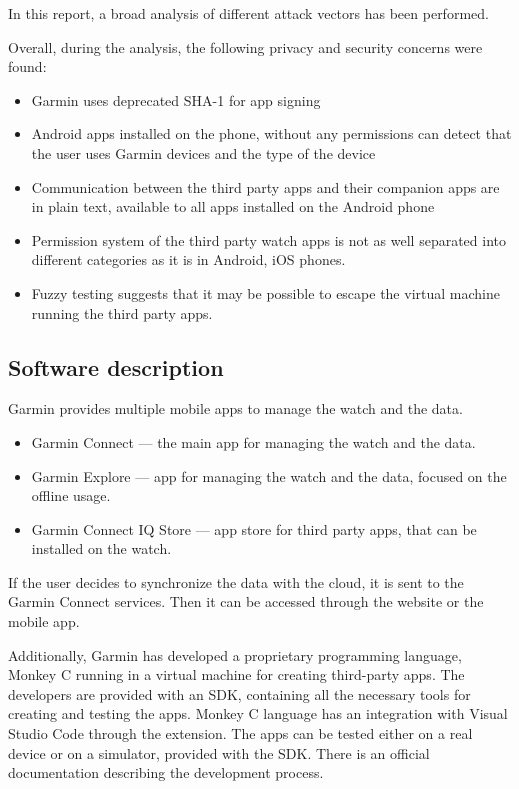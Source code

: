 In this report, a broad analysis of different attack vectors has been performed.

Overall, during the analysis, the following privacy and security concerns were found:
\begin{itemize}
    \item Garmin uses deprecated SHA-1 for app signing
    \item Android apps installed on the phone, without any permissions can detect that the user uses Garmin devices and the type of the device
    \item Communication between the third party apps and their companion apps are in plain text, available to all apps installed on the Android phone
    \item Permission system of the third party watch apps is not as well separated into different categories as it is in Android, iOS phones.
    \item Fuzzy testing suggests that it may be possible to escape the virtual machine running the third party apps.
\end{itemize}


\subsection{Software description}
Garmin provides multiple mobile apps to manage the watch and the data.
\begin{itemize}
    \item Garmin Connect — the main app for managing the watch and the data.
    \item Garmin Explore — app for managing the watch and the data, focused on the offline usage.
    \item Garmin Connect IQ Store — app store for third party apps, that can be installed on the watch.
\end{itemize}

If the user decides to synchronize the data with the cloud, it is sent to the Garmin Connect services.
Then it can be accessed through the website or the mobile app.

Additionally, Garmin has developed a proprietary programming language, Monkey C running in a virtual machine for creating third-party apps.
The developers are provided with an SDK, containing all the necessary tools for creating and testing the apps.
Monkey C language has an integration with Visual Studio Code through the extension.
The apps can be tested either on a real device or on a simulator, provided with the SDK\@.
There is an official documentation describing the development process.


